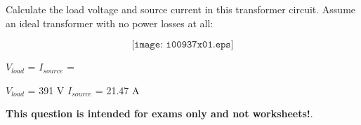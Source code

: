 

Calculate the load voltage and source current in this transformer circuit.  Assume an ideal transformer with no power losses at all:

$$\texttt{[image: i00937x01.eps]}$$

$V_{load}$ = \hskip 80pt $I_{source}$ = 

\vskip 10pt







$V_{load}$ = 391 V \hskip 80pt $I_{source}$ = 21.47 A







{\bf This question is intended for exams only and not worksheets!}.



